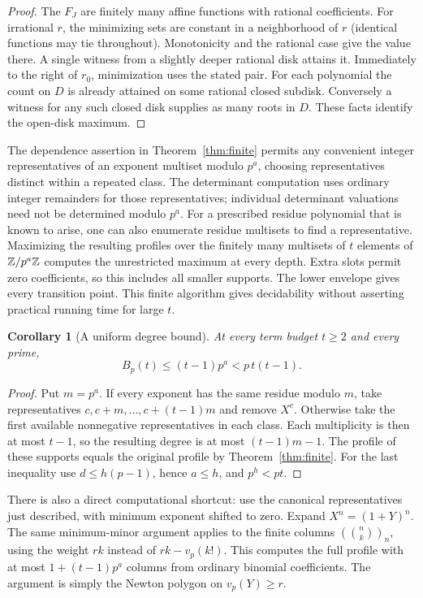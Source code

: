 \documentclass[11pt,letterpaper]{article}
\newtheorem{corollary}[theorem]{Corollary}
\newcommand{\ord}{v_p}\newcommand{\ds}{s_p}
\begin{document}
\begin{proof}
The $F_J$ are finitely many affine functions with rational coefficients. For irrational $r$, the minimizing sets are constant in a neighborhood of $r$ (identical functions may tie throughout). Monotonicity and the rational case give the value there. A single witness from a slightly deeper rational disk attains it. Immediately to the right of $r_0$, minimization uses the stated pair. For each polynomial the count on $D$ is already attained on some rational closed subdisk. Conversely a witness for any such closed disk supplies as many roots in $D$. These facts identify the open-disk maximum.
\end{proof}

The dependence assertion in Theorem~\ref{thm:finite} permits any convenient integer representatives of an exponent multiset modulo $p^a$, choosing representatives distinct within a repeated class. The determinant computation uses ordinary integer remainders for those representatives; individual determinant valuations need not be determined modulo $p^a$. For a prescribed residue polynomial that is known to arise, one can also enumerate residue multisets to find a representative. Maximizing the resulting profiles over the finitely many multisets of $t$ elements of $\mathbb Z/p^a\mathbb Z$ computes the unrestricted maximum at every depth. Extra slots permit zero coefficients, so this includes all smaller supports. The lower envelope gives every transition point. This finite algorithm gives decidability without asserting practical running time for large $t$.

\begin{corollary}[A uniform degree bound]\label{cor:degree}
At every term budget $t\ge2$ and every prime,
\[
 B_p(t)\le(t-1)p^a < p\,t(t-1).
\]
\end{corollary}
\begin{proof}
Put $m=p^a$. If every exponent has the same residue modulo $m$, take representatives $c,c+m,\ldots,c+(t-1)m$ and remove $X^c$. Otherwise take the first available nonnegative representatives in each class. Each multiplicity is then at most $t-1$, so the resulting degree is at most $(t-1)m-1$. The profile of these supports equals the original profile by Theorem~\ref{thm:finite}. For the last inequality use $d\le h(p-1)$, hence $a\le h$, and $p^h<pt$.
\end{proof}
There is also a direct computational shortcut: use the canonical representatives just described, with minimum exponent shifted to zero. Expand $X^n=(1+Y)^n$. The same minimum-minor argument applies to the finite columns $(\binom{n}{k})_n$, using the weight $rk$ instead of $rk-\ord(k!)$. This computes the full profile with at most $1+(t-1)p^a$ columns from ordinary binomial coefficients. The argument is simply the Newton polygon on $\ord(Y)\ge r$.
\end{document}
